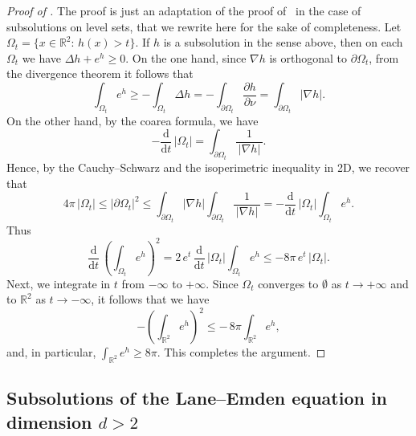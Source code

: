 \documentclass[11pt,a4paper]{article}
\numberwithin{equation}{section}
\theoremstyle{plain}
\theoremstyle{remark}
\newcommand {\f}{\frac}
\begin{document}
\begin{proof}[Proof of ]
The proof is just an adaptation of the proof of~\cite[Lemma 1.1]{Chen_Li91} in the case of subsolutions on level sets, that we rewrite here for the sake of completeness.
Let $\Omega_t = \{x\in \mathbb{R}^2:\,h(x)>t\}$.  If $h$ is a subsolution in the sense above, then on each $\Omega_t$ we have $\Delta h + e^h  \ge  0.$
On the one hand, since $\nabla h$ is orthogonal to $\partial\Omega_t$, from the divergence theorem it follows that
\[
    \int_{\Omega_t} e^h \geq -\int_{\Omega_t} \Delta h = -\int_{\partial\Omega_t} \f{\partial h}{\partial \nu} = \int_{\partial\Omega_t} \left|\nabla h\right|.
\]
On the other hand, by the coarea formula, we have
\[
-\f{\mathrm{d}}{\mathrm{d}t}\,\left|\Omega_t\right|
 = 
\int_{\partial\Omega_t} \f{1}{\,|\nabla h|\,}.
\]
Hence, by the Cauchy--Schwarz and the isoperimetric inequality in 2D, we recover that
\[
4\pi\,|\Omega_t|
 \le 
\left|\partial\Omega_t\right|^2
 \le 
\int_{\partial\Omega_t}\!|\nabla h| \int_{\partial\Omega_t} \!\f{1}{\,|\nabla h|\,}
 = 
-\f{\mathrm{d}}{\mathrm{d}t}\,\left|\Omega_t\right| \int_{\Omega_t} e^h.
\]
Thus
\[
\f{\mathrm{d}}{\mathrm{d}t}\,\left(\int_{\Omega_t} e^h\right)^2
 = 
2\,e^t\,\f{\mathrm{d}}{\mathrm{d}t}\,\left|\Omega_t\right| \int_{\Omega_t} e^h
 \le 
-8\pi\,e^t\,|\Omega_t|.
\]
Next, we integrate in $t$ from $-\infty$ to $+\infty$. Since $\Omega_t$ converges to $\emptyset$ as $t\to+\infty$ and to $\mathbb{R}^2$ as $t\to -\infty$, it follows that we have
\[
-\left(\int_{\mathbb{R}^2}e^h\right)^2
 \le 
-\,8\pi\int_{\mathbb{R}^2} e^h,
\]
and, in particular, $\int_{\mathbb{R}^2} e^h \ge 8\pi$.  This completes the argument.
\end{proof}


\subsection{Subsolutions of the Lane--Emden equation in dimension \texorpdfstring{$d>2$}{d>2}}\label{sec:Lane-Emden}
\end{document}
